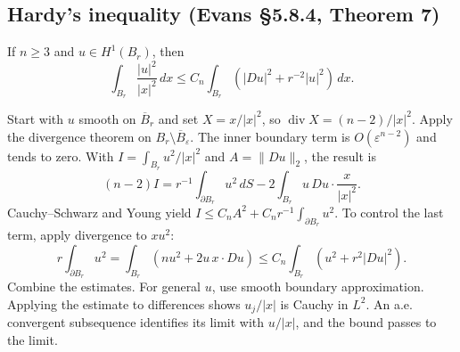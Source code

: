 \subsection{Hardy's inequality (Evans \S5.8.4, Theorem 7)}
\begin{theorem}
If $n\geq3$ and $u\in H^1(B_r)$, then
\[
 \int_{B_r}\frac{|u|^2}{|x|^2}\,dx
 \leq C_n\int_{B_r}\left(|Du|^2+r^{-2}|u|^2\right)\,dx.
\]
\end{theorem}
\begin{expandedproof}
Start with $u$ smooth on $\overline B_r$ and set
$X=x/|x|^2$, so $\operatorname{div}X=(n-2)/|x|^2$.
Apply the divergence theorem on $B_r\setminus\overline B_\varepsilon$.
The inner boundary term is $O(\varepsilon^{n-2})$ and tends to zero.
With $I=\int_{B_r}u^2/|x|^2$ and $A=\|Du\|_2$, the result is
\[
 (n-2)I=r^{-1}\int_{\partial B_r}u^2\,dS
             -2\int_{B_r}u\,Du\cdot\frac{x}{|x|^2}.
\]
Cauchy--Schwarz and Young yield
$I\leq C_n A^2+C_n r^{-1}\int_{\partial B_r}u^2$.
To control the last term, apply divergence to $xu^2$:
\[
 r\int_{\partial B_r}u^2
 =\int_{B_r}(nu^2+2u\,x\cdot Du)
 \leq C_n\int_{B_r}(u^2+r^2|Du|^2).
\]
Combine the estimates. For general $u$, use smooth boundary
approximation. Applying the estimate to differences shows $u_j/|x|$
is Cauchy in $L^2$. An a.e. convergent subsequence identifies its limit
with $u/|x|$, and the bound passes to the limit.
\end{expandedproof}
\Needspace{45mm}

